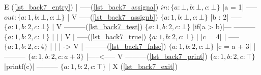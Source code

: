 \begin{minipage}[t]{3in}\label{lst_back7_entry}%
\label{lst_back7_assigna}%
\label{lst_back7_assignb}%
\label{lst_back7_test}%
\label{lst_back7_true}%
\label{lst_back7_false}%
\label{lst_back7_print}%
\label{lst_back7_exit}
\begin{AVerb}
     E (\ref{lst_back7_entry})
     |
   -----(\ref{lst_back7_assigna}) $\mathit{in:} \{a : \bot,b : \bot,c : \bot\}$
  |a = 1|
   -----    $\mathit{out:} \{a : 1,b : \bot,c : \bot\}$
     |  
     V  
   -----(\ref{lst_back7_assignb}) $\{a : 1,b : \bot,c : \bot\}$
  |b : 2|
   -----    $\{a : 1,b : 2,c : \bot\}$
     |  
     V    
 ---------(\ref{lst_back7_test}) $\{a : 1,b : 2,c : \bot\}$
|if(a > b)|---
 ---------    $\{a : 1,b : 2,c : \bot\}$
     |        |
     |        V  
     |      -----(\ref{lst_back7_true}) $\{a : 1,b : 2,c : \bot\}$
     |     |c = 4|
     |      -----    $\{a : 1,b : 2,c : 4\}$
     |        |  
     |         ->
     V           |   
 ---------(\ref{lst_back7_false}) $\{a : 1,b : 2,c : \bot\}$
|c = a + 3|      |
 ---------    $\{a : 1,b : 2,c : a + 3\}$
     |-----<-----
     V    
 ---------(\ref{lst_back7_print}) $\{a : 1,b : 2,c : \top\}$
|printf(c)|
 ---------    $\{a : 1,b : 2,c : \top\}$
     |    
     X (\ref{lst_back7_exit})
\end{AVerb}
\end{minipage}





